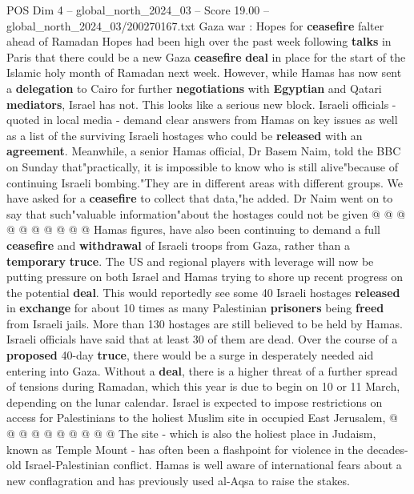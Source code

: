 \begin{textsample}{POS Dim 4 – global\_north\_2024\_03 – Score 19.00 – global\_north\_2024\_03/200270167.txt}  \label{ex:f4_pos_236}
Gaza war : Hopes for \textbf{ceasefire} falter ahead of Ramadan Hopes had been high over the past week following \textbf{talks} in Paris that there could be a new Gaza \textbf{ceasefire} \textbf{deal} in place for the start of the Islamic holy month of Ramadan next week.
However, while Hamas has now sent a \textbf{delegation} to Cairo for further \textbf{negotiations} with \textbf{Egyptian} and Qatari \textbf{mediators}, Israel has not.
This looks like a serious new block.
Israeli officials - quoted in local media - demand clear answers from Hamas on key issues as well as a list of the surviving Israeli hostages who could be \textbf{released} with an \textbf{agreement}.
Meanwhile, a senior Hamas official, Dr Basem Naim, told the BBC on Sunday that"practically, it is impossible to know who is still alive"because of continuing Israeli bombing."They are in different areas with different groups.
We have asked for a \textbf{ceasefire} to collect that data,"he added.
Dr Naim went on to say that such"valuable information"about the hostages could not be given @ @ @ @ @ @ @ @ @ @ Hamas figures, have also been continuing to demand a full \textbf{ceasefire} and \textbf{withdrawal} of Israeli troops from Gaza, rather than a \textbf{temporary} \textbf{truce}.
The US and regional players with leverage will now be putting pressure on both Israel and Hamas trying to shore up recent progress on the potential \textbf{deal}.
This would reportedly see some 40 Israeli hostages \textbf{released} in \textbf{exchange} for about 10 times as many Palestinian \textbf{prisoners} being \textbf{freed} from Israeli jails.
More than 130 hostages are still believed to be held by Hamas.
Israeli officials have said that at least 30 of them are dead.
Over the course of a \textbf{proposed} 40-day \textbf{truce}, there would be a surge in desperately needed aid entering into Gaza.
Without a \textbf{deal}, there is a higher threat of a further spread of tensions during Ramadan, which this year is due to begin on 10 or 11 March, depending on the lunar calendar.
Israel is expected to impose restrictions on access for Palestinians to the holiest Muslim site in occupied East Jerusalem, @ @ @ @ @ @ @ @ @ @ The site - which is also the holiest place in Judaism, known as Temple Mount - has often been a flashpoint for violence in the decades-old Israel-Palestinian conflict.
Hamas is well aware of international fears about a new conflagration and has previously used al-Aqsa to raise the stakes.

\end{textsample}
